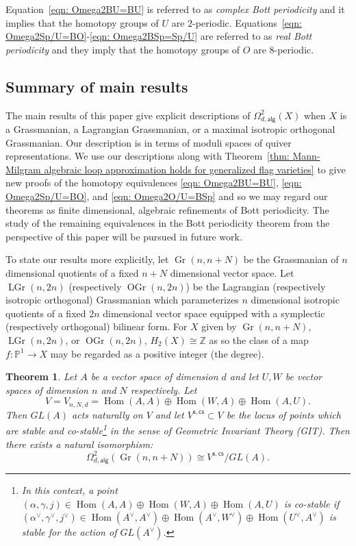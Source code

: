 \documentclass{amsart}
\newtheorem{theorem}{Theorem}[section]
\theoremstyle{definition}
\newcommand{\ZZ} {{\mathbb Z}}		%
\newcommand{\PP}{\mathbb{P}}
\newcommand{\Hom}{\operatorname{Hom}}
\newcommand{\alg}{\mathsf{alg}}
\newcommand{\stable}{\mathsf{s}}
\newcommand{\costable}{\mathsf{cs}}
\newcommand{\Gr}{\operatorname{Gr}}
\newcommand{\LGr}{\operatorname{LGr}}
\newcommand{\OGr}{\operatorname{OGr}}
\newcommand{\LoopTwo}{\Omega^{2}_{d,\alg}}
\begin{document}
Equation~\eqref{eqn: Omega2BU=BU} is referred to as \emph{complex Bott
periodicity} and it implies that the homotopy groups of $U$ are
2-periodic. Equations~\eqref{eqn: Omega2Sp/U=BO}-\eqref{eqn: Omega2BSp=Sp/U} 
are referred to as \emph{real Bott periodicity} and they imply that
the homotopy groups of $O$ are 8-periodic.

\subsection{Summary of main results}

The main results of this paper give explicit descriptions of $\LoopTwo
(X)$ when $X$ is a Grassmanian, a Lagrangian Grassmanian, or a maximal
isotropic orthogonal Grassmanian. Our description is in terms of
moduli spaces of quiver representations. We use our descriptions along
with Theorem~\ref{thm: Mann-Milgram algebraic loop approximation
holds for generalized flag varieties} to give new proofs of the
homotopy equivalences \eqref{eqn: Omega2BU=BU}, \eqref{eqn:
Omega2Sp/U=BO}, and \eqref{eqn: Omega2O/U=BSp} and so we may regard
our theorems as finite dimensional, algebraic refinements of Bott
periodicity. The study of the remaining equivalences in the Bott
periodicity theorem from the perspective of this paper will be pursued
in future work.

To state our results more explicitly, let $\Gr(n,n+N)$ be the
Grassmanian of $n$ dimensional quotients of a fixed $n+N$ dimensional
vector space.  Let $\LGr (n,2n)$ (respectively $\OGr (n,2n)$) be the
Lagrangian (respectively isotropic orthogonal) Grassmanian which
parameterizes $n$ dimensional isotropic  quotients of a fixed $2n$
dimensional vector space equipped with a symplectic (respectively
orthogonal) bilinear form. For $X$ given by $\Gr (n,n+N)$, $\LGr
(n,2n)$, or $\OGr (n,2n)$, $H_{2}(X)\cong \ZZ$ as so the class of a
map $f:\PP^{1}\to X$ may be regarded as a positive integer (the
degree).


\begin{theorem}\label{thm: quiver description of Loop2alg(Gr(n,n+N))}
Let $A$ be a vector space of dimension $d$ and let $U,W$ be vector
spaces of dimension $n$ and $N$ respectively. Let
\[
V=V_{n,N,d} =\Hom (A,A)\oplus \Hom (W,A)\oplus \Hom (A,U).
\]
Then $GL(A)$ acts naturally on $V$ and let $V^{\stable,\costable
}\subset V$ be the locus of points which are stable and
co-stable\footnote{In this context, a point $(\alpha ,\gamma ,j)\in
\Hom (A,A)\oplus \Hom (W,A)\oplus \Hom (A,U)$ is \emph{co-stable} if
$(\alpha^{\vee} ,\gamma^{\vee} ,j^{\vee})\in \Hom
(A^{\vee},A^{\vee})\oplus \Hom (A^{\vee},W^{\vee})\oplus \Hom
(U^{\vee},A^{\vee})$ is stable for the action of $GL(A^{\vee})$.} in
the sense of Geometric Invariant Theory (GIT).  Then there exists a
natural isomorphism:
\[
\LoopTwo (\Gr (n,n+N))\cong V^{\stable,\costable}/GL(A).
\]
\end{theorem}
\end{document}
